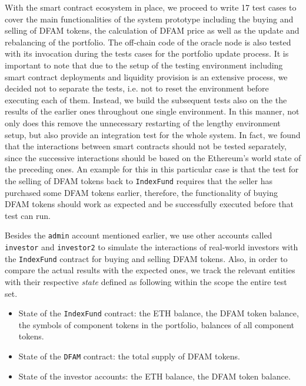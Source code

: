With the smart contract ecosystem in place, we proceed to write 17 test cases to cover the main functionalities of the system prototype including the buying and selling of DFAM tokens, the calculation of DFAM price as well as the update and rebalancing of the portfolio. The off-chain code of the oracle node is also tested with its invocation during the tests cases for the portfolio update process. It is important to note that due to the setup of the testing environment including smart contract deployments and liquidity provision is an extensive process, we decided not to separate the tests, i.e. not to reset the environment before executing each of them. Instead, we build the subsequent tests also on the the results of the earlier ones throughout one single environment. In this manner, not only does this remove the unnecessary restarting of the lengthy environment setup, but also provide an integration test for the whole system. In fact, we found that the interactions between smart contracts should not be tested separately, since the successive interactions should be based on the Ethereum's world state of the preceding ones. An example for this in this particular case is that the test for the selling of DFAM tokens back to \texttt{IndexFund} requires that the seller has purchased some DFAM tokens earlier, therefore, the functionality of buying DFAM tokens should work as expected and be successfully executed before that test can run.

Besides the \texttt{admin} account mentioned earlier, we use other accounts called \texttt{investor} and \texttt{investor2} to simulate the interactions of real-world investors with the \texttt{IndexFund} contract for buying and selling DFAM tokens.  Also, in order to compare the actual results with the expected ones, we track the relevant entities with their respective \textit{state} defined as following within the scope the entire test set.
\begin{itemize}
    \item State of the \texttt{IndexFund} contract: the ETH balance, the DFAM token balance, the symbols of component tokens in the portfolio, balances of all component tokens.
    
    \item State of the \texttt{DFAM} contract: the total supply of DFAM tokens.
    
    \item State of the investor accounts: the ETH balance, the DFAM token balance.
\end{itemize}


